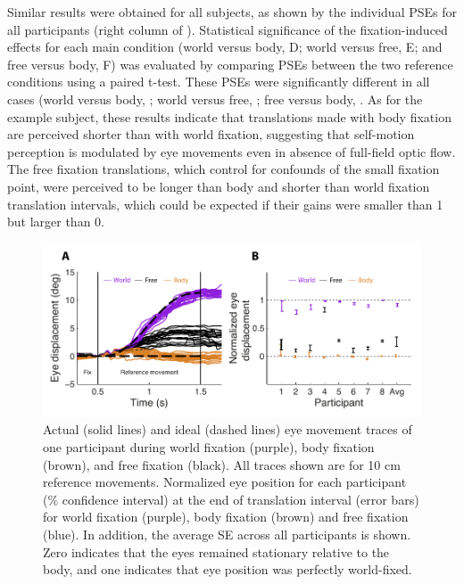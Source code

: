 Similar results were obtained for all subjects, as shown by the individual PSEs for all participants (right column of ). Statistical significance of the fixation-induced effects for each main condition (world versus body, D; world versus free, E; and free versus body, F) was evaluated by comparing PSEs between the two reference conditions using a paired t-test. These PSEs were significantly different in all cases (world versus body, ; world versus free, ; free versus body, . As for the example subject, these results indicate that translations made with body fixation are perceived shorter than with world fixation, suggesting that self-motion perception is modulated by eye movements even in absence of full-field optic flow. The free fixation translations, which control for confounds of the small fixation point, were perceived to be longer than body and shorter than world fixation translation intervals, which could be expected if their gains were smaller than 1 but larger than 0.

\begin{figure}
    \includegraphics[width=1.0\textwidth]{src/paper3/figure3.pdf}

    \caption{ Actual (solid lines) and ideal (dashed lines) eye movement traces of one participant during world fixation (purple), body fixation (brown), and free fixation (black). All traces shown are for 10 \si{\centi\metre} reference movements.  Normalized eye position for each participant (\% confidence interval) at the end of translation interval (error bars) for world fixation (purple), body fixation (brown) and free fixation (blue). In addition, the average {\textpm}SE across all participants is shown. Zero indicates that the eyes remained stationary relative to the body, and one indicates that eye position was perfectly world-fixed.}
    \label{p3:fig3}
\end{figure}

